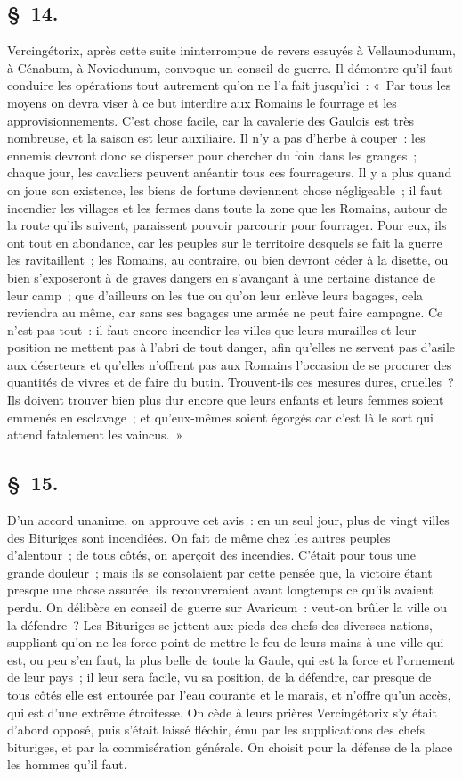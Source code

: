 \documentclass[french,twoside]{book} %
\begin{document}
\subsection[{§ 14.}]{ \textsc{§ 14.} }
\noindent Vercingétorix, après cette suite ininterrompue de revers essuyés à Vellaunodunum, à Cénabum, à Noviodunum, convoque un conseil de guerre. Il démontre qu’il faut conduire les opérations tout autrement qu’on ne l’a fait jusqu’ici : « Par tous les moyens on devra viser à ce but interdire aux Romains le fourrage et les approvisionnements. C'est chose facile, car la cavalerie des Gaulois est très nombreuse, et la saison est leur auxiliaire. Il n’y a pas d’herbe à couper : les ennemis devront donc se disperser pour chercher du foin dans les granges ; chaque jour, les cavaliers peuvent anéantir tous ces fourrageurs. Il y a plus quand on joue son existence, les biens de fortune deviennent chose négligeable ; il faut incendier les villages et les fermes dans toute la zone que les Romains, autour de la route qu’ils suivent, paraissent pouvoir parcourir pour fourrager. Pour eux, ils ont tout en abondance, car les peuples sur le territoire desquels se fait la guerre les ravitaillent ; les Romains, au contraire, ou bien devront céder à la disette, ou bien s’exposeront à de graves dangers en s’avançant à une certaine distance de leur camp ; que d’ailleurs on les tue ou qu’on leur enlève leurs bagages, cela reviendra au même, car sans ses bagages une armée ne peut faire campagne. Ce n’est pas tout : il faut encore incendier les villes que leurs murailles et leur position ne mettent pas à l’abri de tout danger, afin qu’elles ne servent pas d’asile aux déserteurs et qu’elles n’offrent pas aux Romains l’occasion de se procurer des quantités de vivres et de faire du butin. Trouvent-ils ces mesures dures, cruelles ? Ils doivent trouver bien plus dur encore que leurs enfants et leurs femmes soient emmenés en esclavage ; et qu’eux-mêmes soient égorgés car c’est là le sort qui attend fatalement les vaincus. »
\subsection[{§ 15.}]{ \textsc{§ 15.} }
\noindent D'un accord unanime, on approuve cet avis : en un seul jour, plus de vingt villes des Bituriges sont incendiées. On fait de même chez les autres peuples d’alentour ; de tous côtés, on aperçoit des incendies. C'était pour tous une grande douleur ; mais ils se consolaient par cette pensée que, la victoire étant presque une chose assurée, ils recouvreraient avant longtemps ce qu’ils avaient perdu. On délibère en conseil de guerre sur Avaricum : veut-on brûler la ville ou la défendre ? Les Bituriges se jettent aux pieds des chefs des diverses nations, suppliant qu’on ne les force point de mettre le feu de leurs mains à une ville qui est, ou peu s’en faut, la plus belle de toute la Gaule, qui est la force et l’ornement de leur pays ; il leur sera facile, vu sa position, de la défendre, car presque de tous côtés elle est entourée par l’eau courante et le marais, et n’offre qu’un accès, qui est d’une extrême étroitesse. On cède à leurs prières Vercingétorix s’y était d’abord opposé, puis s’était laissé fléchir, ému par les supplications des chefs bituriges, et par la commisération générale. On choisit pour la défense de la place les hommes qu’il faut.
\end{document}
